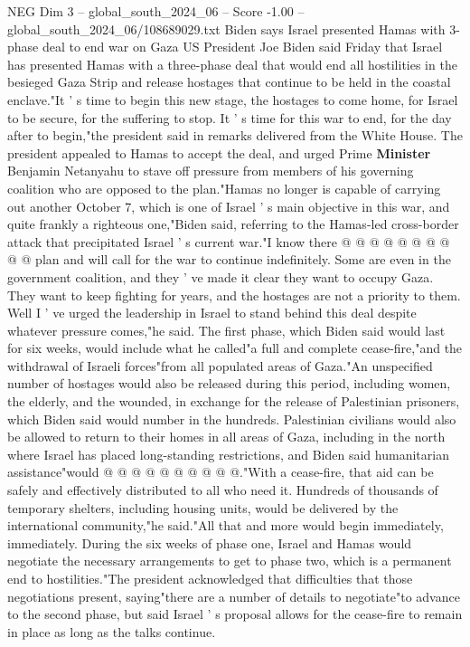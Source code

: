 \begin{textsample}{NEG Dim 3 – global\_south\_2024\_06 – Score -1.00 – global\_south\_2024\_06/108689029.txt}  \label{ex:f3_neg_111}
Biden says Israel presented Hamas with 3-phase deal to end war on Gaza US President Joe Biden said Friday that Israel has presented Hamas with a three-phase deal that would end all hostilities in the besieged Gaza Strip and release hostages that continue to be held in the coastal enclave."It ' s time to begin this new stage, the hostages to come home, for Israel to be secure, for the suffering to stop.
It ' s time for this war to end, for the day after to begin,"the president said in remarks delivered from the White House.
The president appealed to Hamas to accept the deal, and urged Prime \textbf{Minister} Benjamin Netanyahu to stave off pressure from members of his governing coalition who are opposed to the plan."Hamas no longer is capable of carrying out another October 7, which is one of Israel ' s main objective in this war, and quite frankly a righteous one,"Biden said, referring to the Hamas-led cross-border attack that precipitated Israel ' s current war."I know there @ @ @ @ @ @ @ @ @ @ plan and will call for the war to continue indefinitely.
Some are even in the government coalition, and they ' ve made it clear they want to occupy Gaza.
They want to keep fighting for years, and the hostages are not a priority to them.
Well I ' ve urged the leadership in Israel to stand behind this deal despite whatever pressure comes,"he said.
The first phase, which Biden said would last for six weeks, would include what he called"a full and complete cease-fire,"and the withdrawal of Israeli forces"from all populated areas of Gaza."An unspecified number of hostages would also be released during this period, including women, the elderly, and the wounded, in exchange for the release of Palestinian prisoners, which Biden said would number in the hundreds.
Palestinian civilians would also be allowed to return to their homes in all areas of Gaza, including in the north where Israel has placed long-standing restrictions, and Biden said humanitarian assistance"would @ @ @ @ @ @ @ @ @ @."With a cease-fire, that aid can be safely and effectively distributed to all who need it.
Hundreds of thousands of temporary shelters, including housing units, would be delivered by the international community,"he said."All that and more would begin immediately, immediately.
During the six weeks of phase one, Israel and Hamas would negotiate the necessary arrangements to get to phase two, which is a permanent end to hostilities."The president acknowledged that difficulties that those negotiations present, saying"there are a number of details to negotiate"to advance to the second phase, but said Israel ' s proposal allows for the cease-fire to remain in place as long as the talks continue.

\end{textsample}
